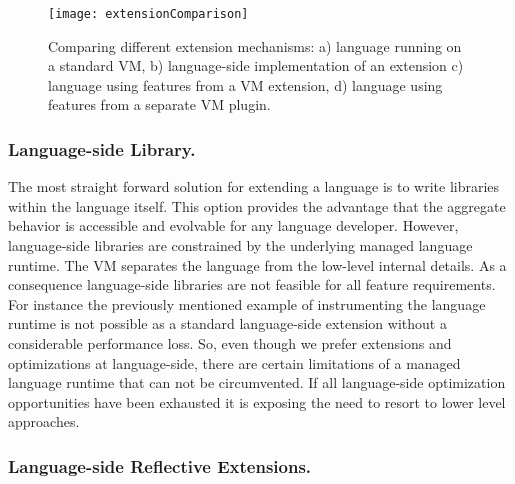 
\begin{figure}
	\texttt{[image: extensionComparison]}
	\caption{Comparing different extension mechanisms: 
		a) language running on a standard VM, 
		b) language-side implementation of an extension
		c) language using features from a VM extension, 
		d) language using features from a separate VM plugin.}
\end{figure}

\subsubsection{Language-side Library.}

The most straight forward solution for extending a language is to write libraries within the language itself. 
This option provides the advantage that the aggregate behavior is accessible and evolvable for any language developer.
However, language-side libraries are constrained by the underlying managed language runtime.
The VM separates the language from the low-level internal details.
As a consequence language-side libraries are not feasible for all feature requirements.
For instance the previously mentioned example of instrumenting the language runtime is not possible as a standard language-side extension without a considerable performance loss.
So, even though we prefer extensions and optimizations at language-side, there are certain limitations of a managed language runtime that can not be circumvented.
If all language-side optimization opportunities have been exhausted it is exposing the need to resort to lower level approaches.


\subsubsection{Language-side Reflective Extensions.}

